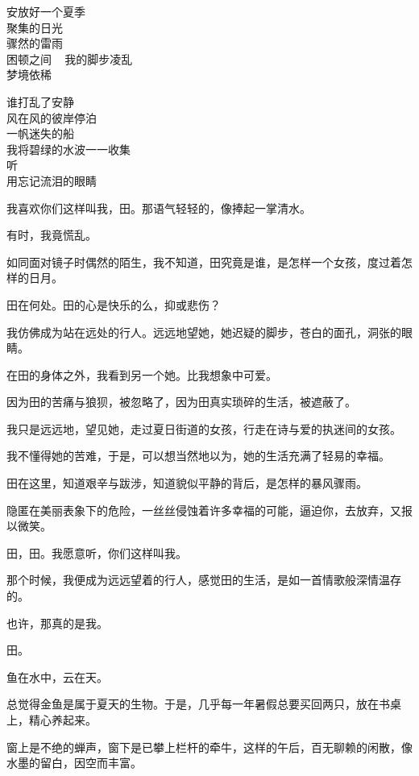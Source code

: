 		 安放好一个夏季 \\
		 聚集的日光 \\
		 骤然的雷雨 \\
		 困顿之间 ~ 我的脚步凌乱 \\
		 梦境依稀

		 谁打乱了安静 \\
		 风在风的彼岸停泊 \\
		 一帆迷失的船 \\
		 我将碧绿的水波一一收集 \\
		 听 \\
		 用忘记流泪的眼睛

	\endlongpoem
	\endwriting



		我喜欢你们这样叫我，田。那语气轻轻的，像捧起一掌清水。\par
		有时，我竟慌乱。\par
		如同面对镜子时偶然的陌生，我不知道，田究竟是谁，是怎样一个女孩，度过着怎样的日月。\par
		田在何处。田的心是快乐的么，抑或悲伤？\par
		我仿佛成为站在远处的行人。远远地望她，她迟疑的脚步，苍白的面孔，洞张的眼睛。\par
		在田的身体之外，我看到另一个她。比我想象中可爱。\par
		因为田的苦痛与狼狈，被忽略了，因为田真实琐碎的生活，被遮蔽了。\par
		我只是远远地，望见她，走过夏日街道的女孩，行走在诗与爱的执迷间的女孩。\par
		我不懂得她的苦难，于是，可以想当然地以为，她的生活充满了轻易的幸福。\par
		田在这里，知道艰辛与跋涉，知道貌似平静的背后，是怎样的暴风骤雨。\par
		隐匿在美丽表象下的危险，一丝丝侵蚀着许多幸福的可能，逼迫你，去放弃，又报以微笑。\par
		田，田。我愿意听，你们这样叫我。\par
		那个时候，我便成为远远望着的行人，感觉田的生活，是如一首情歌般深情温存的。\par
		也许，那真的是我。\par
		田。

	\endwriting



		鱼在水中，云在天。

		\vspace{2em}
		总觉得金鱼是属于夏天的生物。于是，几乎每一年暑假总要买回两只，放在书桌上，精心养起来。\par
		窗上是不绝的蝉声，窗下是已攀上栏杆的牵牛，这样的午后，百无聊赖的闲散，像水墨的留白，因空而丰富。

